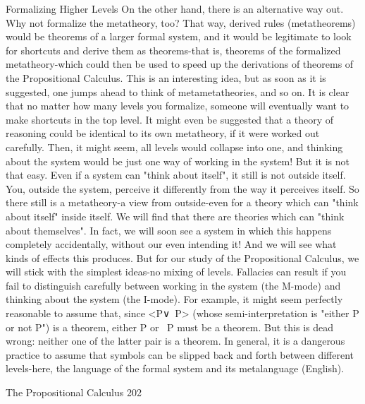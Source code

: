                              Formalizing Higher Levels
On the other hand, there is an alternative way out. Why not formalize the metatheory,
too? That way, derived rules (metatheorems) would be theorems of a larger formal
system, and it would be legitimate to look for shortcuts and derive them as theorems-that
is, theorems of the formalized metatheory-which could then be used to speed up the
derivations of theorems of the Propositional Calculus. This is an interesting idea, but as
soon as it is suggested, one jumps ahead to think of metametatheories, and so on. It is
clear that no matter how many levels you formalize, someone will eventually want to
make shortcuts in the top level.
         It might even be suggested that a theory of reasoning could be identical to its own
metatheory, if it were worked out carefully. Then, it might seem, all levels would
collapse into one, and thinking about the system would be just one way of working in the
system! But it is not that easy. Even if a system can "think about itself", it still is not
outside itself. You, outside the system, perceive it differently from the way it perceives
itself. So there still is a metatheory-a view from outside-even for a theory which can
"think about itself" inside itself. We will find that there are theories which can "think
about themselves". In fact, we will soon see a system in which this happens completely
accidentally, without our even intending it! And we will see what kinds of effects this
produces. But for our study of the Propositional Calculus, we will stick with the simplest
ideas-no mixing of levels.
         Fallacies can result if you fail to distinguish carefully between working in the
system (the M-mode) and thinking about the system (the I-mode). For example, it might
seem perfectly reasonable to assume that, since <P∨~P> (whose semi-interpretation is
"either P or not P") is a theorem, either P or ~P must be a theorem. But this is dead
wrong: neither one of the latter pair is a theorem. In general, it is a dangerous practice to
assume that symbols can be slipped back and forth between different levels-here, the
language of the formal system and its metalanguage (English).




The Propositional Calculus                                                               202

